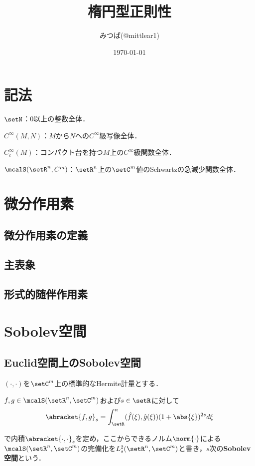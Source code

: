 \documentclass[uplatex,dvipdfmx]{jsarticle}
\title{楕円型正則性}
\author{みつば(@mittlear1)}
\date{\today}
\newcommand{\smooth}{$C^{\infty}$級}
\newcommand{\sobolev}[1]{L^{2}_{#1}}
\newcommand{\sobolevlocal}[3]{\sobolev{#1}(\setR^{#2},\setC^{#3})}
\newcommand{\smoothfct}{C^{\infty}}
\newcommand{\schwartz}[2]{\mcalS(\setR^{#1},\setC^{#2})}
\newcommand{\dd}{d} %
\begin{document}
\maketitle
\tableofcontents

\newpage
\section*{記法}
$\setN$：0以上の整数全体．

$\smoothfct(M,N)$：$M$から$N$への\smooth 写像全体．

$C^{\infty}_c(M)$：コンパクト台を持つ$M$上の\smooth 関数全体．

$\mcalS(\setR^n,C^m)$：$\setR^n$上の$\setC^m$値のSchwartzの急減少関数全体．



\newpage
\section{微分作用素}

\subsection{微分作用素の定義}

\subsection{主表象}

\subsection{形式的随伴作用素}

\newpage
\section{Sobolev空間}

\subsection{Euclid空間上のSobolev空間}

$(\cdot,\cdot)$を$\setC^m$上の標準的なHermite計量とする．

\begin{definition}
  $f, g\in \schwartz{n}{m}$および$s\in \setR$に対して
  \[ \abracket{f,g}_s=\int_\setR^n (\hat{f}(\xi),\hat{g}(\xi))(1+\abs{\xi})^{2s}\dd \xi \]
\end{definition}
で内積$\abracket{\cdot,\cdot}_s$を定め，ここからできるノルム$\norm{\cdot}$による
$\schwartz{n}{m}$の完備化を$\sobolevlocal{s}{n}{m}$と書き，$s$次の\textbf{Sobolev空間}という．
\end{document}

